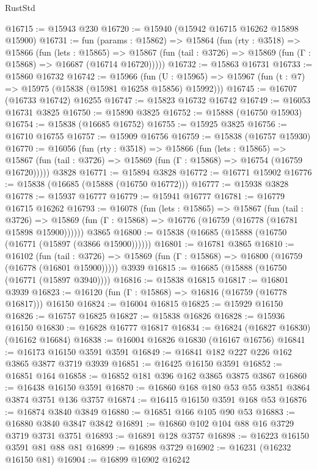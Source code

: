 \begin{lexlean}{RustStd}
\begin{coremodule}
@16715 := @15943 @230
@16720 := @15940 (@15942 @16715 @16262 @15898 @15900)
@16731 := fun (params : @15862) =>
  @15864
    (fun (rty : @3518) =>
    @15866
      (fun (lets : @15865) =>
      @15867 (fun (tail : @3726) => @15869 (fun (Γ : @15868) => @16687 (@16714 @16720)))))
@16732 := @15863 @16731
@16733 := @15860 @16732
@16742 := @15966
    (fun (U : @15965) => @15967 (fun (t : @7) => @15975 (@15838 (@15981 @16258 @15856) @15992)))
@16745 := @16707 (@16733 @16742) @16255
@16747 := @15823 @16732 @16742
@16749 := @16053 @16731 @3825
@16750 := @15890 @3825
@16752 := @15888 (@16750 @15903)
@16754 := @15838 (@16685 @16752)
@16755 := @15925 @3825
@16756 := @16710 @16755
@16757 := @15909 @16756
@16759 := @15838 (@16757 @15930)
@16770 := @16056
    (fun (rty : @3518) =>
    @15866
      (fun (lets : @15865) =>
      @15867 (fun (tail : @3726) => @15869 (fun (Γ : @15868) => @16754 (@16759 @16720)))))
    @3828
@16771 := @15894 @3828
@16772 := @16771 @15902
@16776 := @15838 (@16685 (@15888 (@16750 @16772)))
@16777 := @15938 @3828
@16778 := @15937 @16777
@16779 := @15941 @16777
@16781 := @16779 @16715 @16262
@16793 := @16078
    (fun (lets : @15865) =>
    @15867
      (fun (tail : @3726) =>
      @15869 (fun (Γ : @15868) => @16776 (@16759 (@16778 (@16781 @15898 @15900))))))
    @3865
@16800 := @15838 (@16685 (@15888 (@16750 (@16771 (@15897 (@3866 @15900))))))
@16801 := @16781 @3865
@16810 := @16102
    (fun (tail : @3726) => @15869 (fun (Γ : @15868) => @16800 (@16759 (@16778 (@16801 @15900)))))
    @3939
@16815 := @16685 (@15888 (@16750 (@16771 (@15897 @3940))))
@16816 := @15838 @16815
@16817 := @16801 @3939
@16823 := @16120 (fun (Γ : @15868) => @16816 (@16759 (@16778 @16817))) @16150
@16824 := @16004 @16815
@16825 := @15929 @16150
@16826 := @16757 @16825
@16827 := @15838 @16826
@16828 := @15936 @16150
@16830 := @16828 @16777 @16817
@16834 := @16824 (@16827 @16830) (@16162 @16684)
@16838 := @16004 @16826 @16830 (@16167 @16756)
@16841 := @16173 @16150 @3591 @3591
@16849 := @16841 @182 @227 @226 @162 @3865 @3877 @3719 @3939
@16851 := @16425 @16150 @3591
@16852 := @16851 @164
@16858 := @16852 @181 @396 @162 @3865 @3875 @3867
@16860 := @16438 @16150 @3591
@16870 := @16860 @168 @180 @53 @55 @3851 @3864 @3874 @3751 @136 @3757
@16874 := @16415 @16150 @3591 @168 @53
@16876 := @16874 @3840 @3849
@16880 := @16851 @166 @105 @90 @53
@16883 := @16880 @3840 @3847 @3842
@16891 := @16860 @102 @104 @88 @16 @3729 @3719 @3731 @3751
@16893 := @16891 @128 @3757
@16898 := @16223 @16150 @3591 @81 @88 @81
@16899 := @16898 @3729
@16902 := @16231 (@16232 @16150 @81)
@16904 := @16899 @16902 @16242

\end{coremodule}
\end{lexlean}
